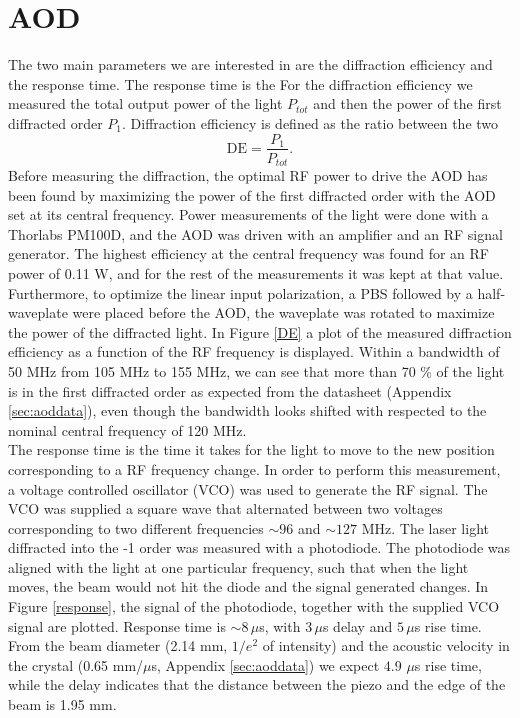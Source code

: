 \section{AOD}
\label{sec:resultaod}
The two main parameters we are interested in are the diffraction efficiency and the response time. The response time is the For the diffraction efficiency we measured the total output power of the light $P_{tot}$ and then the power of the first diffracted order $P_{1}$. Diffraction efficiency is defined as the ratio between the two
\begin{equation}
\label{eq:de}
\text{DE} = \frac{P_1}{P_{tot}}.
\end{equation}
Before measuring the diffraction, the optimal RF power to drive the AOD has been found by maximizing the power of the first diffracted order with the AOD set at its central frequency. Power measurements of the light were done with a Thorlabs PM100D, and the AOD was driven with an amplifier and an RF signal generator. The highest efficiency at the central frequency was found for an RF power of 0.11 W, and for the rest of the measurements it was kept at that value. Furthermore, to optimize the linear input polarization, a PBS followed by a half-waveplate were placed before the AOD, the waveplate was rotated to maximize the power of the diffracted light. In Figure \ref{DE} a plot of the measured diffraction efficiency as a function of the RF frequency is displayed. Within a bandwidth of 50 MHz from 105 MHz to 155 MHz, we can see that more than 70 \% of the light is in the first diffracted order as expected from the datasheet (Appendix \ref{sec:aoddata}), even though the bandwidth looks shifted with respected to the nominal central frequency of 120 MHz.\\
The response time is the time it takes for the light to move to the new position corresponding to a RF frequency change. In order to perform this measurement, a voltage controlled oscillator (VCO) was used to generate the RF signal. The VCO was supplied a square wave that alternated between two voltages corresponding to two different frequencies $\sim 96$ and $\sim 127$ MHz. The laser light diffracted into the -1 order was measured with a photodiode. The photodiode was aligned with the light at one particular frequency, such that when the light moves, the beam would not hit the diode and the signal generated changes. In Figure \ref{response}, the signal of the photodiode, together with the supplied VCO signal are plotted. Response time is $\sim 8\,\mu$s, with $3\,\mu$s delay and $5\,\mu$s rise time. From the beam diameter (2.14 mm, $1/e^2$ of intensity) and the acoustic velocity in the crystal (0.65 mm/$\mu$s, Appendix \ref{sec:aoddata}) we expect $4.9$ $\mu$s rise time, while the delay indicates that the distance between the piezo and the edge of the beam is 1.95 mm.

